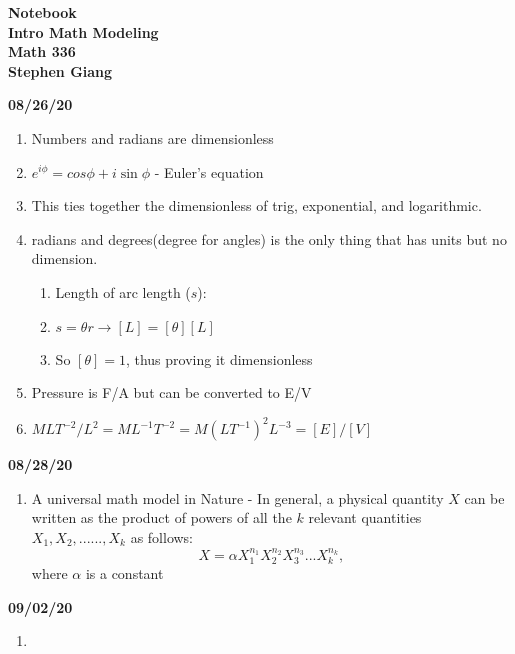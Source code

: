 \documentclass[11pt]{article}
\newcommand{\skipline}{\vspace{\baselineskip}}
\begin{document}
	
	\begin{center}
		\textbf{Notebook} \\
		\textbf{Intro Math Modeling} \\
		\textbf{Math 336} \\
		\textbf{Stephen Giang} \\
	\end{center}

	\textbf{08/26/20}
	\begin{enumerate}
		\item Numbers and radians are dimensionless 
		\item $e^{i\phi} = cos\phi + i\sin\phi$ - Euler's equation
		\item This ties together the dimensionless of trig, exponential, and logarithmic. 
		\item radians and degrees(degree for angles) is the only thing that has units but no dimension.
		\begin{enumerate}
			\item Length of arc length ($s$):
			\item $s = \theta r  \rightarrow [L] = [\theta][L]$ 
			\item So $[\theta] = 1$, thus proving it dimensionless 
		\end{enumerate}
		\item Pressure is F/A but can be converted to E/V
		\item $MLT^{-2}/L^2 = ML^{-1}T^{-2} = M(LT^{-1})^2L^{-3} = [E]/[V]$
	\end{enumerate}
	\skipline
	\textbf{08/28/20}
	\begin{enumerate}
		\item A universal math model in Nature - In general, a physical quantity $X$ can be written as the product of powers of all the $k$
		relevant quantities $X_1, X_2, ......, X_k$ as follows:
		$$X = \alpha X_1^{n_1}X_2^{n_2}X_3^{n_3}...X_k^{n_k},$$
		where $\alpha$ is a constant
	\end{enumerate}
	\skipline
	\textbf{09/02/20}
	\begin{enumerate}
		\item 
	\end{enumerate}

	
\end{document}
